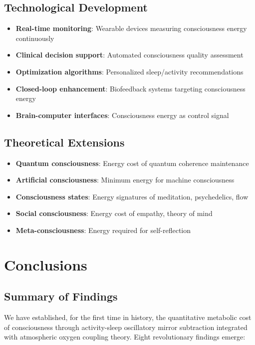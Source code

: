 \documentclass[12pt]{article}
\theoremstyle{remark}
\begin{document}
\subsection{Technological Development}

\begin{itemize}
\item \textbf{Real-time monitoring}: Wearable devices measuring consciousness energy continuously
\item \textbf{Clinical decision support}: Automated consciousness quality assessment
\item \textbf{Optimization algorithms}: Personalized sleep/activity recommendations
\item \textbf{Closed-loop enhancement}: Biofeedback systems targeting consciousness energy
\item \textbf{Brain-computer interfaces}: Consciousness energy as control signal
\end{itemize}

\subsection{Theoretical Extensions}

\begin{itemize}
\item \textbf{Quantum consciousness}: Energy cost of quantum coherence maintenance
\item \textbf{Artificial consciousness}: Minimum energy for machine consciousness
\item \textbf{Consciousness states}: Energy signatures of meditation, psychedelics, flow
\item \textbf{Social consciousness}: Energy cost of empathy, theory of mind
\item \textbf{Meta-consciousness}: Energy required for self-reflection
\end{itemize}

\section{Conclusions}

\subsection{Summary of Findings}

We have established, for the first time in history, the quantitative metabolic cost of consciousness through activity-sleep oscillatory mirror subtraction integrated with atmospheric oxygen coupling theory. Eight revolutionary findings emerge:
\end{document}
